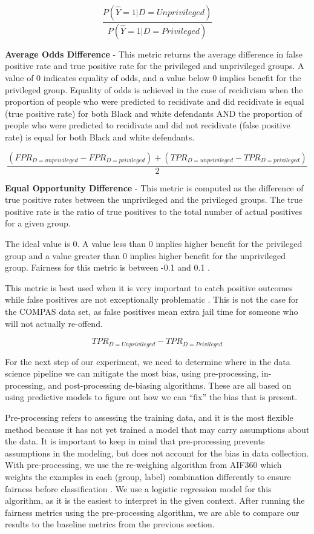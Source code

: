 \documentclass[water,article,submit,moreauthors,pdftex]{mdpi}
\begin{document}
\[\frac{P(\hat{Y}=1|D=Unprivileged)}{P(\hat{Y}=1|D=Privileged)}\]

\textbf{Average Odds Difference} - This metric returns the average
difference in false positive rate and true positive rate for the
privileged and unprivileged groups. A value of 0 indicates equality of
odds, and a value below 0 implies benefit for the privileged group.
Equality of odds is achieved in the case of recidivism when the
proportion of people who were predicted to recidivate and did recidivate
is equal (true positive rate) for both Black and white defendants AND
the proportion of people who were predicted to recidivate and did not
recidivate (false positive rate) is equal for both Black and white
defendants\citep{aif360-oct-2018}.

\[\frac{(FPR_{D = unprivileged} - FPR_{D = privileged}) + (TPR_{D = unprivileged} - TPR_{D = privileged})}{2}\]

\textbf{Equal Opportunity Difference} - This metric is computed as the
difference of true positive rates between the unprivileged and the
privileged groups. The true positive rate is the ratio of true positives
to the total number of actual positives for a given
group\citep{GoogleDev}.

The ideal value is 0. A value less than 0 implies higher benefit for the
privileged group and a value greater than 0 implies higher benefit for
the unprivileged group. Fairness for this metric is between -0.1 and 0.1
\citep{aif360-oct-2018}.

This metric is best used when it is very important to catch positive
outcomes while false positives are not exceptionally problematic
\citep{Cortez2019How}. This is not the case for the COMPAS data set, as
false positives mean extra jail time for someone who will not actually
re-offend.

\[TPR_{D = Unprivileged} - TPR_{D = Privileged}\]

For the next step of our experiment, we need to determine where in the
data science pipeline we can mitigate the most bias, using
pre-processing, in-processing, and post-processing de-biasing
algorithms. These are all based on using predictive models to figure out
how we can ``fix'' the bias that is present.

Pre-processing refers to assessing the training data, and it is the most
flexible method because it has not yet trained a model that may carry
assumptions about the data. It is important to keep in mind that
pre-processing prevents assumptions in the modeling, but does not
account for the bias in data collection. With pre-processing, we use the
re-weighing algorithm from AIF360 which weights the examples in each
(group, label) combination differently to ensure fairness before
classification \citep{aif360-oct-2018}. We use a logistic regression
model for this algorithm, as it is the easiest to interpret in the given
context. After running the fairness metrics using the pre-processing
algorithm, we are able to compare our results to the baseline metrics
from the previous section.
\end{document}
